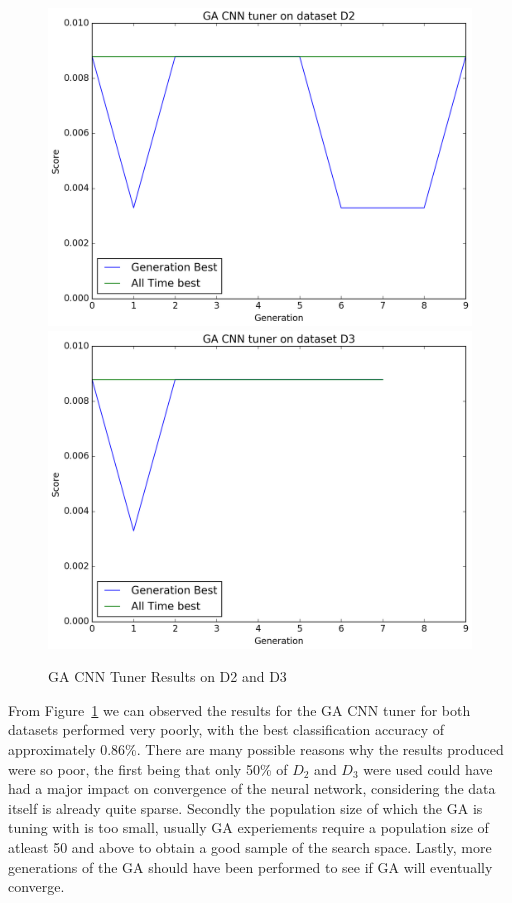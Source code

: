 \begin{figure}
	\vspace{-0.5cm}
	
	\includegraphics[width=\linewidth]{sections/imgs/ga/ga_cnn_tuner-dataset_2.png}
	\includegraphics[width=\linewidth]{sections/imgs/ga/ga_cnn_tuner-dataset_3.png}
	
	\caption{GA CNN Tuner Results on D2 and D3}
	\label{fig:ga_cnn_results}
\end{figure}

From Figure~\ref{fig:ga_cnn_results} we can observed the results for the GA CNN tuner for both datasets performed very poorly, with the best classification accuracy of approximately 0.86\%. There are many possible reasons why the results produced were so poor, the first being that only 50\% of $D_{2}$ and $D_{3}$ were used could have had a major impact on convergence of the neural network, considering the data itself is already quite sparse. Secondly the population size of which the GA is tuning with is too small, usually GA experiements require a population size of atleast 50 and above to obtain a good sample of the search space. Lastly, more generations of the GA should have been performed to see if GA will eventually converge. 

